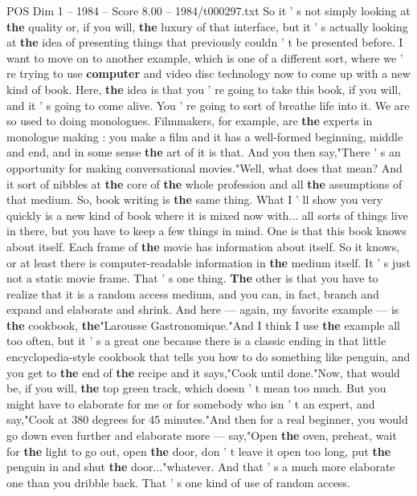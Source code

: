 \begin{textsample}{POS Dim 1 – 1984 – Score 8.00 – 1984/t000297.txt}
So it ' s not simply looking at \textbf{the} quality or, if you will, \textbf{the} luxury of that interface, but it ' s actually looking at \textbf{the} idea of presenting things that previously couldn ' t be presented before.
I want to move on to another example, which is one of a different sort, where we ' re trying to use \textbf{computer} and video disc technology now to come up with a new kind of book.
Here, \textbf{the} idea is that you ' re going to take this book, if you will, and it ' s going to come alive.
You ' re going to sort of breathe life into it.
We are so used to doing monologues.
Filmmakers, for example, are \textbf{the} experts in monologue making : you make a film and it has a well-formed beginning, middle and end, and in some sense \textbf{the} art of it is that.
And you then say,"There ' s an opportunity for making conversational movies."Well, what does that mean?
And it sort of nibbles at \textbf{the} core of \textbf{the} whole profession and all \textbf{the} assumptions of that medium.
So, book writing is \textbf{the} same thing.
What I ' ll show you very quickly is a new kind of book where it is mixed now with... all sorts of things live in there, but you have to keep a few things in mind.
One is that this book knows about itself.
Each frame of \textbf{the} movie has information about itself.
So it knows, or at least there is computer-readable information in \textbf{the} medium itself.
It ' s just not a static movie frame.
That ' s one thing. \textbf{The} other is that you have to realize that it is a random access medium, and you can, in fact, branch and expand and elaborate and shrink.
And here — again, my favorite example — is \textbf{the} cookbook, \textbf{the}"Larousse Gastronomique."And I think I use \textbf{the} example all too often, but it ' s a great one because there is a classic ending in that little encyclopedia-style cookbook that tells you how to do something like penguin, and you get to \textbf{the} end of \textbf{the} recipe and it says,"Cook until done."Now, that would be, if you will, \textbf{the} top green track, which doesn ' t mean too much.
But you might have to elaborate for me or for somebody who isn ' t an expert, and say,"Cook at 380 degrees for 45 minutes."And then for a real beginner, you would go down even further and elaborate more — say,"Open \textbf{the} oven, preheat, wait for \textbf{the} light to go out, open \textbf{the} door, don ' t leave it open too long, put \textbf{the} penguin in and shut \textbf{the} door..."whatever.
And that ' s a much more elaborate one than you dribble back.
That ' s one kind of use of random access.

\end{textsample}
